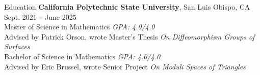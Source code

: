 \documentclass[
	11pt, %
]{cv} %
\begin{document}
\begin{rSection}{Education}
	\textbf{California Polytechnic State University}, San Luis Obispo, CA \hfill Sept. 2021 -- June 2025 \\
	Master of Science in  Mathematics \hfill \textit{GPA: 4.0/4.0} \\
	\-\hspace{1cm}Advised by Patrick Orson, wrote Master's Thesis \textit{On Diffeomorphism Groups of Surfaces}\\
	Bachelor of Science in Mathematics \hfill \textit{GPA: 4.0/4.0} \\
	\-\hspace{1cm}Advised by Eric Brussel, wrote Senior Project \textit{On Moduli Spaces of Triangles}
\end{rSection}
\end{document}

